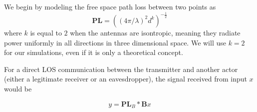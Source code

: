 We begin by modeling the free space path loss \cite{Free_space_path_loss} between two points as
\begin{equation}
  \bm{PL} = ((4 \pi / \lambda)^2 d^k)^{-\frac{1}{2}}
\end{equation}
where $k$ is equal to $2$ when the antennas are isontropic, meaning they radiate power uniformly in all directions in three dimensional space. We will use $k = 2$ for our simulations, even if it is only a theoretical concept.

For a direct LOS communication between the transmitter and another actor (either a legitimate receiver or an eavesdropper), the signal received from input $x$ would be

\begin{equation}
  y = \bm{PL}_B * \bm{B}x
\end{equation}

